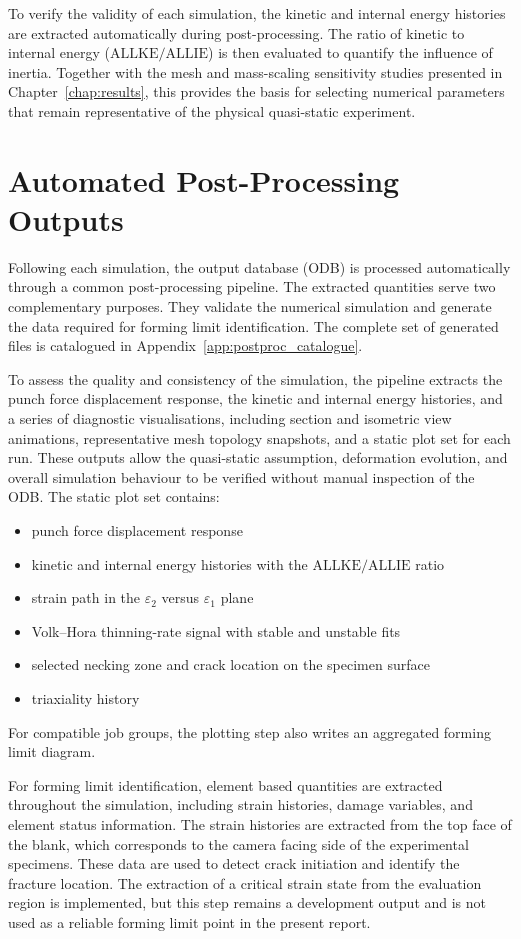 To verify the validity of each simulation, the kinetic and internal energy
histories are extracted automatically during post-processing. The ratio of
kinetic to internal energy ($\mathrm{ALLKE}/\mathrm{ALLIE}$) is then evaluated
to quantify the influence of inertia. Together with the mesh and mass-scaling
sensitivity studies presented in Chapter~\ref{chap:results}, this provides the
basis for selecting numerical parameters that remain representative of the
physical quasi-static experiment.

\section{Automated Post-Processing Outputs}

Following each simulation, the output database (ODB) is processed
automatically through a common post-processing pipeline. The extracted
quantities serve two complementary purposes. They validate the numerical
simulation and generate the data required for forming limit identification.
The complete set of generated files is catalogued in
Appendix~\ref{app:postproc_catalogue}.

To assess the quality and consistency of the simulation, the pipeline extracts
the punch force displacement response, the kinetic and internal energy
histories, and a series of diagnostic visualisations, including section and
isometric view animations, representative mesh topology snapshots, and a static
plot set for each run.
These outputs allow the quasi-static assumption, deformation evolution, and
overall simulation behaviour to be verified without manual inspection of the
ODB.
The static plot set contains:
\begin{itemize}
  \item punch force displacement response
  \item kinetic and internal energy histories with the
  $\mathrm{ALLKE}/\mathrm{ALLIE}$ ratio
  \item strain path in the $\varepsilon_2$ versus $\varepsilon_1$ plane
  \item Volk--Hora thinning-rate signal with stable and unstable fits
  \item selected necking zone and crack location on the specimen surface
  \item triaxiality history
\end{itemize}
For compatible job groups, the plotting step also writes an aggregated forming
limit diagram.

For forming limit identification, element based quantities are extracted
throughout the simulation, including strain histories, damage variables, and
element status information. The strain histories are extracted from the top
face of the blank, which corresponds to the camera facing side of the
experimental specimens. These data are used to detect crack initiation and
identify the fracture location. The extraction of a critical strain state from
the evaluation region is implemented, but this step remains a development output
and is not used as a reliable forming limit point in the present report.


